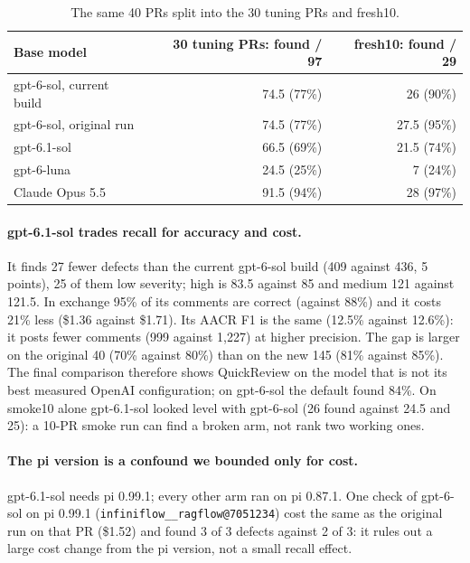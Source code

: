 \documentclass[11pt,a4paper]{article}
\newcommand{\qcr}{QuickReview}
\newcommand{\code}[1]{\texttt{#1}}
\begin{document}
\begin{table}[!tbp]
  \centering
  \small
  \caption{The same 40 PRs split into the 30 tuning PRs and fresh10.}
  \label{tab:bmsplit}
  \begin{tabular}{lrr}
    \toprule
    Base model & 30 tuning PRs: found / 97 & fresh10: found / 29 \\
    \midrule
    gpt-6-sol, current build & 74.5 (77\%) & 26 (90\%) \\
    gpt-6-sol, original run & 74.5 (77\%) & 27.5 (95\%) \\
    gpt-6.1-sol & 66.5 (69\%) & 21.5 (74\%) \\
    gpt-6-luna & 24.5 (25\%) & 7 (24\%) \\
    Claude Opus 5.5 & 91.5 (94\%) & 28 (97\%) \\
    \bottomrule
  \end{tabular}
\end{table}

\paragraph{gpt-6.1-sol trades recall for accuracy and cost.} It finds 27
fewer defects than the current gpt-6-sol build (409 against 436, 5 points),
25 of them low severity; high is 83.5 against 85 and medium 121 against
121.5. In exchange 95\% of its comments are correct (against 88\%) and it
costs 21\% less (\$1.36 against \$1.71). Its AACR F1 is the same (12.5\%
against 12.6\%): it posts fewer comments (999 against 1{,}227) at higher
precision. The gap is larger on the original 40 (70\% against 80\%) than on
the new 145 (81\% against 85\%). The final comparison therefore shows \qcr{}
on the model that is not its best measured OpenAI configuration; on
gpt-6-sol the default found 84\%. On smoke10 alone gpt-6.1-sol looked level
with gpt-6-sol (26 found against 24.5 and 25): a 10-PR smoke run can find a
broken arm, not rank two working ones.

\paragraph{The pi version is a confound we bounded only for cost.}
gpt-6.1-sol needs pi 0.99.1; every other arm ran on pi 0.87.1. One check of
gpt-6-sol on pi 0.99.1 (\code{infiniflow\_\_ragflow@7051234}) cost the same
as the original run on that PR (\$1.52) and found 3 of 3 defects against 2
of 3: it rules out a large cost change from the pi version, not a small
recall effect.
\end{document}
